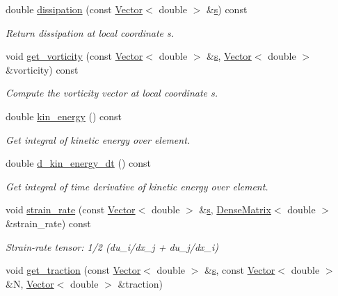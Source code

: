 \begin{DoxyCompactItemize}
double \hyperlink{classoomph_1_1NavierStokesEquations_ac747021b481794f294bbb9cd2d72bf3f}{dissipation} (const \hyperlink{classoomph_1_1Vector}{Vector}$<$ double $>$ \&\hyperlink{cfortran_8h_ab7123126e4885ef647dd9c6e3807a21c}{s}) const
\begin{DoxyCompactList}\small\item\em Return dissipation at local coordinate s. \end{DoxyCompactList}\item 
void \hyperlink{classoomph_1_1NavierStokesEquations_a113a52ef23061f08c4b40c2ae1a5a14f}{get\+\_\+vorticity} (const \hyperlink{classoomph_1_1Vector}{Vector}$<$ double $>$ \&\hyperlink{cfortran_8h_ab7123126e4885ef647dd9c6e3807a21c}{s}, \hyperlink{classoomph_1_1Vector}{Vector}$<$ double $>$ \&vorticity) const
\begin{DoxyCompactList}\small\item\em Compute the vorticity vector at local coordinate s. \end{DoxyCompactList}\item 
double \hyperlink{classoomph_1_1NavierStokesEquations_a12ff399b68817da67a079dc378fc8442}{kin\+\_\+energy} () const
\begin{DoxyCompactList}\small\item\em Get integral of kinetic energy over element. \end{DoxyCompactList}\item 
double \hyperlink{classoomph_1_1NavierStokesEquations_a86da10e50c1133b614f3f28b38b798c2}{d\+\_\+kin\+\_\+energy\+\_\+dt} () const
\begin{DoxyCompactList}\small\item\em Get integral of time derivative of kinetic energy over element. \end{DoxyCompactList}\item 
void \hyperlink{classoomph_1_1NavierStokesEquations_a76c94447cea90c07cd511efb5e9e263a}{strain\+\_\+rate} (const \hyperlink{classoomph_1_1Vector}{Vector}$<$ double $>$ \&\hyperlink{cfortran_8h_ab7123126e4885ef647dd9c6e3807a21c}{s}, \hyperlink{classoomph_1_1DenseMatrix}{Dense\+Matrix}$<$ double $>$ \&strain\+\_\+rate) const
\begin{DoxyCompactList}\small\item\em Strain-\/rate tensor\+: 1/2 (du\+\_\+i/dx\+\_\+j + du\+\_\+j/dx\+\_\+i) \end{DoxyCompactList}\item 
void \hyperlink{classoomph_1_1NavierStokesEquations_abf3d6e1353276c4520876a19cdcf588f}{get\+\_\+traction} (const \hyperlink{classoomph_1_1Vector}{Vector}$<$ double $>$ \&\hyperlink{cfortran_8h_ab7123126e4885ef647dd9c6e3807a21c}{s}, const \hyperlink{classoomph_1_1Vector}{Vector}$<$ double $>$ \&N, \hyperlink{classoomph_1_1Vector}{Vector}$<$ double $>$ \&traction)

\end{DoxyCompactItemize}
